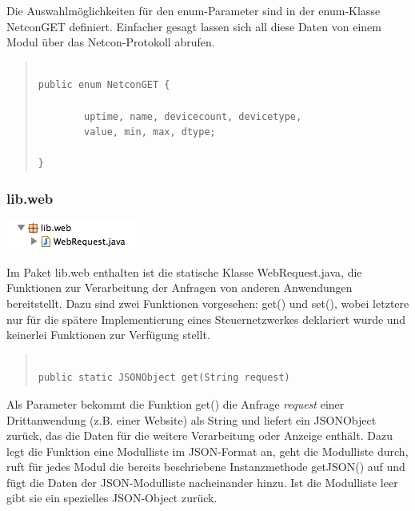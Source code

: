 \documentclass[a4paper,14pt,headsepline]{scrartcl}
\begin{document}
Die Auswahlmöglichkeiten für den enum-Parameter sind in der enum-Klasse NetconGET definiert. Einfacher gesagt lassen sich all diese Daten von einem Modul über das Netcon-Protokoll abrufen.  


\begin{quote}
\begin{verbatim}

public enum NetconGET {

	    uptime, name, devicecount, devicetype, 
	    value, min, max, dtype;

}

\end{verbatim}
\end{quote}

\newpage

\subsubsection*{lib.web}

\includegraphics[width=0.2 \paperwidth]{./bilder/lib_web.png}

Im Paket lib.web enthalten ist die statische Klasse WebRequest.java, die Funktionen zur Verarbeitung der Anfragen von anderen Anwendungen bereitstellt. Dazu sind zwei Funktionen vorgesehen: get() und set(), wobei letztere nur für die spätere Implementierung eines Steuernetzwerkes deklariert wurde und keinerlei Funktionen zur Verfügung stellt. 

\begin{quote}
\begin{verbatim}

public static JSONObject get(String request)

\end{verbatim}
\end{quote} 

Als Parameter bekommt die Funktion get() die Anfrage \textit{request} einer Drittanwendung (z.B. einer Website) als String und liefert ein JSONObject zurück, das die Daten für die weitere Verarbeitung oder Anzeige enthält. Dazu legt die Funktion eine Modulliste im JSON-Format an, geht die Modulliste durch, ruft für jedes Modul die bereits beschriebene Instanzmethode getJSON() auf und fügt die Daten der JSON-Modulliste nacheinander hinzu. Ist die Modulliste leer gibt sie ein spezielles JSON-Object zurück. 
\end{document}
